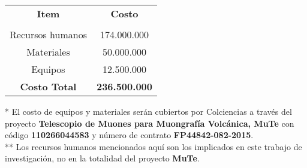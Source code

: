 \begin{tabular}{|c|c|}\hline
{\bf Item} & {\bf Costo} \\
			& 				\\\hline
Recursos humanos	&  174.000.000 \\\hline
Materiales			& 50.000.000	\\\hline
Equipos			& 12.500.000	\\\hline
\bf Costo Total		  			& {\bf 236.500.000}		\\\hline
\end{tabular}

\vspace{2cm}

* El costo de equipos y materiales serán cubiertos por Colciencias a través del proyecto \textbf{Telescopio de Muones para Muongrafía Volcánica, MuTe} con código \textbf{110266044583} y número de contrato \textbf{FP44842-082-2015}.\\

** Los recursos humanos mencionados aquí son los implicados en este trabajo de investigación, no en la totalidad del proyecto \textbf{MuTe}.